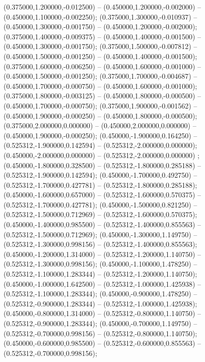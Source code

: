  (0.375000,1.200000,-0.012500) -- (0.450000,1.200000,-0.002000) -- (0.450000,1.100000,-0.002250);
 (0.375000,1.300000,-0.010937) -- (0.450000,1.300000,-0.001750) -- (0.450000,1.200000,-0.002000);
 (0.375000,1.400000,-0.009375) -- (0.450000,1.400000,-0.001500) -- (0.450000,1.300000,-0.001750);
 (0.375000,1.500000,-0.007812) -- (0.450000,1.500000,-0.001250) -- (0.450000,1.400000,-0.001500);
 (0.375000,1.600000,-0.006250) -- (0.450000,1.600000,-0.001000) -- (0.450000,1.500000,-0.001250);
 (0.375000,1.700000,-0.004687) -- (0.450000,1.700000,-0.000750) -- (0.450000,1.600000,-0.001000);
 (0.375000,1.800000,-0.003125) -- (0.450000,1.800000,-0.000500) -- (0.450000,1.700000,-0.000750);
 (0.375000,1.900000,-0.001562) -- (0.450000,1.900000,-0.000250) -- (0.450000,1.800000,-0.000500);
 (0.375000,2.000000,0.000000) -- (0.450000,2.000000,0.000000) -- (0.450000,1.900000,-0.000250);
 (0.450000,-1.900000,0.164250) -- (0.525312,-1.900000,0.142594) -- (0.525312,-2.000000,0.000000);
 (0.450000,-2.000000,0.000000) -- (0.525312,-2.000000,0.000000) ;
 (0.450000,-1.800000,0.328500) -- (0.525312,-1.800000,0.285188) -- (0.525312,-1.900000,0.142594);
 (0.450000,-1.700000,0.492750) -- (0.525312,-1.700000,0.427781) -- (0.525312,-1.800000,0.285188);
 (0.450000,-1.600000,0.657000) -- (0.525312,-1.600000,0.570375) -- (0.525312,-1.700000,0.427781);
 (0.450000,-1.500000,0.821250) -- (0.525312,-1.500000,0.712969) -- (0.525312,-1.600000,0.570375);
 (0.450000,-1.400000,0.985500) -- (0.525312,-1.400000,0.855563) -- (0.525312,-1.500000,0.712969);
 (0.450000,-1.300000,1.149750) -- (0.525312,-1.300000,0.998156) -- (0.525312,-1.400000,0.855563);
 (0.450000,-1.200000,1.314000) -- (0.525312,-1.200000,1.140750) -- (0.525312,-1.300000,0.998156);
 (0.450000,-1.100000,1.478250) -- (0.525312,-1.100000,1.283344) -- (0.525312,-1.200000,1.140750);
 (0.450000,-1.000000,1.642500) -- (0.525312,-1.000000,1.425938) -- (0.525312,-1.100000,1.283344);
 (0.450000,-0.900000,1.478250) -- (0.525312,-0.900000,1.283344) -- (0.525312,-1.000000,1.425938);
 (0.450000,-0.800000,1.314000) -- (0.525312,-0.800000,1.140750) -- (0.525312,-0.900000,1.283344);
 (0.450000,-0.700000,1.149750) -- (0.525312,-0.700000,0.998156) -- (0.525312,-0.800000,1.140750);
 (0.450000,-0.600000,0.985500) -- (0.525312,-0.600000,0.855563) -- (0.525312,-0.700000,0.998156);
